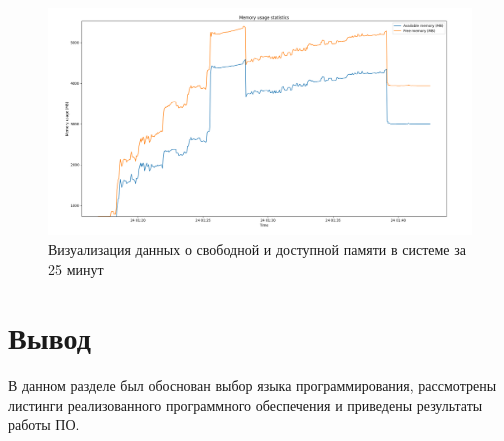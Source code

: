 \begin{figure}[h!]
	\begin{center}
		\includegraphics[scale=0.25]{img/memory_visual_example.png}
	\end{center}
	\captionsetup{justification=centering}
	\caption{Визуализация данных о свободной и доступной памяти в системе за 25 минут}
	\label{img:memory_visual_example}
\end{figure}

\section*{Вывод}

В данном разделе был обоснован выбор языка программирования, рассмотрены листинги реализованного программного обеспечения и приведены результаты работы ПО.